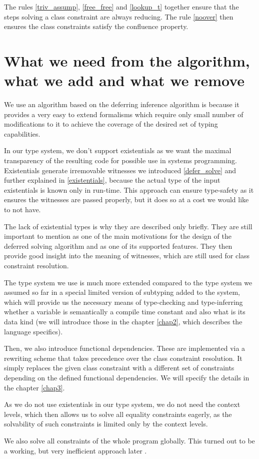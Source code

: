 The rules \ref{triv_assump}, \ref{free_free} and \ref{lookup_t} together ensure that the steps solving a class constraint are always reducing. The rule \ref{noover} then ensures the class constraints satisfy the confluence property.

\section{What we need from the algorithm, what we add and what we remove}

We use an algorithm based on the deferring inference algorithm is because it provides a very easy to extend formalisms which require only small number of modifications to it to achieve the coverage of the desired set of typing capabilities.

In our type system, we don't support existentials as we want the maximal transparency of the resulting code for possible use in systems programming. Existentials generate irremovable witnesses we introduced \ref{defer_solve} and further explained in \ref{existentials}, because the actual type of the input existentials is known only in run-time. This approach can ensure type-safety as it ensures the witnesses are passed properly, but it does so at a cost we would like to not have.

The lack of existential types is why they are described only briefly. They are still important to mention as one of the main motivations for the design of the deferred solving algorithm and as one of its supported features. They then provide good insight into the meaning of witnesses, which are still used for class constraint resolution.

The type system we use is much more extended compared to the type system we assumed so far in a special limited version of subtyping added to the system, which will provide us the necessary means of type-checking and type-inferring whether a variable is semantically a compile time constant and also what is its data kind (we will introduce those in the chapter \ref{chap2}, which describes the language specifics).

Then, we also introduce functional dependencies. These are implemented via a rewriting scheme that takes precedence over the class constraint resolution. It simply replaces the given class constraint with a different set of constraints depending on the defined functional dependencies. We will specify the details in the chapter \ref{chap3}.

As we do not use existentials in our type system, we do not need the context levels, which then allows us to solve all equality constraints eagerly, as the solvability of such constraints is limited only by the context levels.

We also solve all constraints of the whole program globally. This turned out to be a working, but very inefficient approach later .
